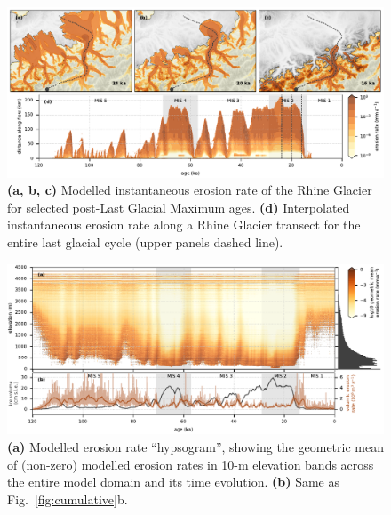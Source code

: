 \documentclass[utf8]{article}
\begin{document}
    \begin{figure}
      \centerline{\includegraphics{alpero_transects}}
      \caption{%
        \textbf{(a, b, c)} Modelled instantaneous erosion rate of the Rhine
          Glacier for selected post-Last Glacial Maximum ages.
        \textbf{(d)} Interpolated instantaneous erosion rate along a Rhine
          Glacier transect for the entire last glacial cycle (upper panels
          dashed line).}
      \label{fig:transects}
    \end{figure}

    \begin{figure}
      \centerline{\includegraphics{alpero_hypsogram}}
      \caption{%
        \textbf{(a)} Modelled erosion rate ``hypsogram'', showing the geometric
          mean of (non-zero) modelled erosion rates in 10-m elevation bands
          across the entire model domain and its time evolution.
        \textbf{(b)} Same as Fig.~\ref{fig:cumulative}b.}
      \label{fig:hypsogram}
    \end{figure}
\end{document}
